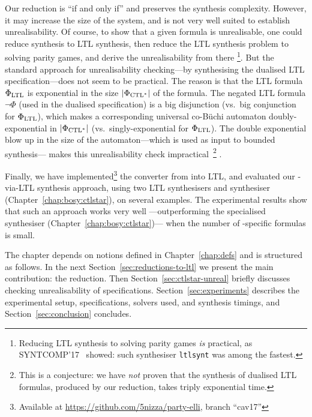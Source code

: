 Our reduction is ``if and only if'' and preserves the synthesis complexity.
However, it may increase the size of the system, and is not very well suited to establish unrealisability.
Of course, to show that a given \CTLstar formula is unrealisable,
one could reduce \CTLstar synthesis to LTL synthesis,
then reduce the LTL synthesis problem to solving parity games,
and derive the unrealisability from there%
\footnote{Reducing LTL synthesis to solving parity games \emph{is} practical, as SYNTCOMP'17~\cite{syntcomp} showed:
  such synthesiser {\tt ltlsynt} was among the fastest.}.
But the standard approach for unrealisability checking---by synthesising the dualised LTL specification---does not seem to be practical.
The reason is that the LTL formula $\Phi_\text{LTL}$ is exponential in the size $|\Phi_{\text{CTL}^*}|$ of the \CTLstar formula.
The negated LTL formula $\neg \Phi$ (used in the dualised specification)
is a big disjunction (vs.\ big conjunction for $\Phi_\text{LTL}$),
which makes a corresponding universal co-B\"uchi automaton doubly-exponential in $|\Phi_{\text{CTL}^*}|$
(vs.\ singly-exponential for $\Phi_\text{LTL}$).
The double exponential blow up in the size of the automaton---which is used as input to bounded synthesis---%
makes this unrealisability check impractical~\footnote{%
  This is a conjecture:
  we have \emph{not} proven that the synthesis of dualised LTL formulas, produced by our reduction, takes triply exponential time.}%
.

Finally, we have implemented\footnote{Available at \url{https://github.com/5nizza/party-elli}, branch ``cav17''}
the converter from \CTLstar into LTL,
and evaluated our \CTLstar-via-LTL synthesis approach,
using two LTL synthesisers and \CTLstar synthesiser (Chapter~\ref{chap:bosy:ctlstar}),
on several examples.
The experimental results show that such an approach works very well%
---outperforming the specialised \CTLstar synthesiser
   (Chapter~\ref{chap:bosy:ctlstar})---%
when the number of \CTLstar-specific formulas is small.

The chapter depends on notions defined in Chapter~\ref{chap:defs}
and is structured as follows.
In the next Section~\ref{sec:reductions-to-ltl}
we present the main contribution: the reduction.
Then Section~\ref{sec:ctlstar-unreal} briefly discusses checking unrealisability of \CTLstar specifications.
Section~\ref{sec:experiments} describes the experimental setup, specifications, solvers used, and synthesis timings,
and Section~\ref{sec:conclusion} concludes.


